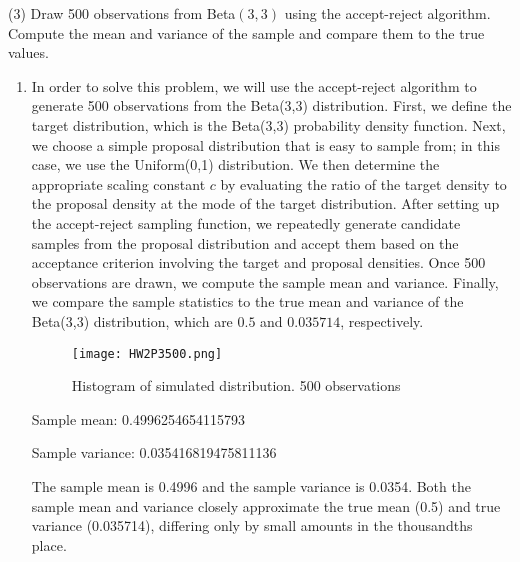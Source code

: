 \documentclass[final,11pt]{article}
\begin{document}
\begin{spacing}{1.25}
(3) Draw 500 observations from Beta$(3,3)$ using the accept-reject algorithm. Compute the mean and variance of the sample and compare them to the true values.
\begin{enumerate}
    \item In order to solve this problem, we will use the accept-reject algorithm to generate 500 observations from the Beta(3,3) distribution. First, we define the target distribution, which is the Beta(3,3) probability density function. Next, we choose a simple proposal distribution that is easy to sample from; in this case, we use the Uniform(0,1) distribution. We then determine the appropriate scaling constant \( c \) by evaluating the ratio of the target density to the proposal density at the mode of the target distribution. After setting up the accept-reject sampling function, we repeatedly generate candidate samples from the proposal distribution and accept them based on the acceptance criterion involving the target and proposal densities. Once 500 observations are drawn, we compute the sample mean and variance. Finally, we compare the sample statistics to the true mean and variance of the Beta(3,3) distribution, which are \( 0.5 \) and \( 0.035714 \), respectively.
    \FloatBarrier
    \begin{figure}[h]
        \centering
        \texttt{[image: HW2P3500.png]}
        \caption{Histogram of simulated distribution. 500 observations}
        \label{fig:beta-500}
    \end{figure}
    Sample mean: 0.4996254654115793
    
    Sample variance: 0.035416819475811136

    The sample mean is 0.4996 and the sample variance is 0.0354. Both the sample mean and variance closely approximate the true mean (0.5) and true variance (0.035714), differing only by small amounts in the thousandths place.
\end{enumerate}

\end{spacing}
\end{document}
